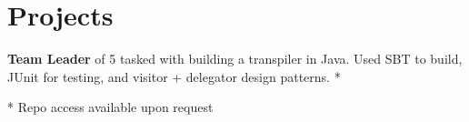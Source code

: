 \documentclass[]{two-column-resume}
\begin{document}
\begin{minipage}[t]{0.65\textwidth}
\section{Projects}
\textbf{Team Leader} of 5 tasked with building a transpiler in Java. Used SBT to build, JUnit for testing, and visitor + delegator design patterns. *
\sectionsep



* Repo access available upon request
\end{minipage}

\end{document}
